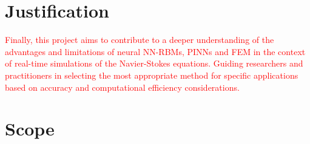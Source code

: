 \documentclass[12pt,letterpaper]{article}
\begin{document}
\section{Justification}

\textcolor{red}{ Finally, this project aims to contribute to a deeper understanding of the advantages and limitations of neural NN-RBMs, PINNs and FEM in the context of real-time simulations of the Navier-Stokes equations. Guiding researchers and practitioners in selecting the most appropriate method for specific applications based on accuracy and computational efficiency considerations.}\\

\section{Scope}

\end{document}
